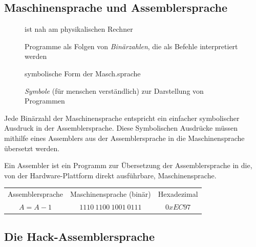 \documentclass[12pt]{report}
\begin{document}
\subsection{Maschinensprache und Assemblersprache}
\begin{figure}[H]
  \begin{minipage}[t]{0.5\textwidth}
    \begin{defbox}[Maschinensprache]
      ist nah am physikalischen Rechner
      
      Programme als Folgen von \textit{Binärzahlen}, die als Befehle interpretiert werden
    \end{defbox}
  \end{minipage}
  \hfill
  \begin{minipage}[t]{0.5\textwidth}
    \begin{defbox}[Assemblersprache]
      symbolische Form der Masch.sprache
      
      \textit{Symbole} (für menschen verständlich) zur Darstellung von Programmen
    \end{defbox}
  \end{minipage}
\end{figure}

Jede Binärzahl der Maschinensprache entspricht ein einfacher symbolischer Ausdruck in der Assemblersprache.
Diese Symbolischen Ausdrücke müssen mithilfe eines Assemblers aus der Assemblersprache in die Maschinensprache übersetzt werden.

\begin{defbox}
  Ein Assembler ist ein Programm zur Übersetzung der Assemblersprache in die, 
  von der Hardware-Plattform direkt ausführbare, Maschinensprache.
\end{defbox}

\begin{exbox}
  \begin{table}[H]
    \centering
    \begin{tabular}{ccc}
      Assemblersprache & Maschinensprache (binär) & Hexadezimal \\
      $A = A-1$        & $1110\ 1100\ 1001\ 0111$ & $0xEC97$
    \end{tabular}
  \end{table}
\end{exbox}

\subsection{Die Hack-Assemblersprache}
\end{document}
